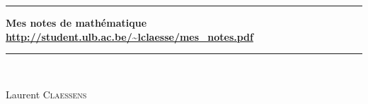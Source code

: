 
\thispagestyle{empty}
\begin{center}
  \begin{minipage}{15cm}
    \hrule\par
    \vspace{2mm}
    \begin{center}
    \Huge \bfseries Mes notes de mathématique \\        %
    \normalsize
    \url{http://student.ulb.ac.be/~lclaesse/mes_notes.pdf}
    \end{center}
    \hrule\par
  \end{minipage}\\
  \vspace{0.2cm}
\end{center}

\vspace{2cm}

\begin{center}
    Laurent \textsc{Claessens}\\
    \date{Décembre 2014}

    \vspace{1cm}

\end{center}

\vfill

\LogoEtLicence










\clearpage

